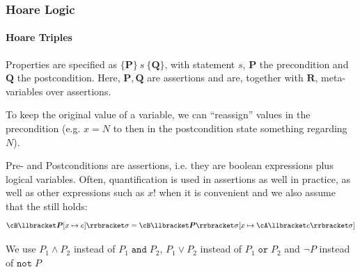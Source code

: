 \newpage
\subsubsection{Hoare Logic}
\paragraph{Hoare Triples}
\inlinedefinition Properties are specified as  $\{ \bm{P} \} \ s \ \{ \bm{Q} \}$, with statement $s$, $\bm{P}$ the precondition and $\bm{Q}$ the postcondition.
Here, $\bm{P}, \bm{Q}$ are assertions and are, together with $\bm{R}$, meta-variables over assertions.

 To keep the original value of a variable, we can ``reassign'' values in the precondition
(e.g. $x = N$ to then in the postcondition state something regarding $N$).

Pre- and Postconditions are assertions, i.e. they are boolean expressions plus logical variables.
Often, quantification is used in assertions as well in practice, as well as other expressions such as $x!$ when it is convenient and we also assume that the 
still holds:
\[
    \cB \llbracket \bm{P}[x \mapsto e] \rrbracket \sigma = \cB \llbracket \bm{P} \rrbracket \sigma [x \mapsto \cA \llbracket e \rrbracket \sigma]
\]

We use $P_1 \land P_2$ instead of $P_1 \; \texttt{and} \; P_2$, $P_1 \lor P_2$ instead of $P_1 \; \texttt{or} \; P_2$ and $\neg P$ instead of $\texttt{not}\; P$
